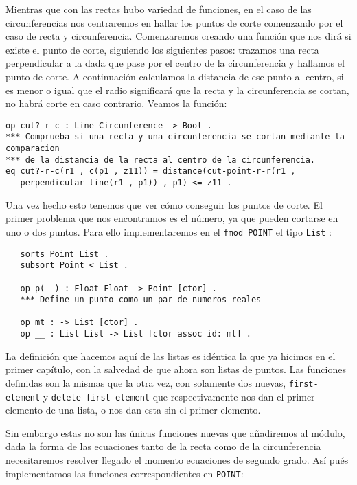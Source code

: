 Mientras que con las rectas hubo variedad de funciones, en el caso de las circunferencias nos centraremos en hallar los puntos de corte comenzando por el caso de recta y circunferencia. Comenzaremos creando una función que nos dirá si existe el punto de corte, siguiendo los siguientes pasos: trazamos una recta perpendicular a la dada que pase por el centro de la circunferencia y hallamos el punto de corte. A continuación calculamos la distancia de ese punto al centro, si es menor o igual que el radio significará que la recta y la circunferencia se cortan, no habrá corte en caso contrario. Veamos la función: \par

{\codesize
\begin{verbatim}
op cut?-r-c : Line Circumference -> Bool .
*** Comprueba si una recta y una circunferencia se cortan mediante la comparacion 
*** de la distancia de la recta al centro de la circunferencia.
eq cut?-r-c(r1 , c(p1 , z11)) = distance(cut-point-r-r(r1 , 
   perpendicular-line(r1 , p1)) , p1) <= z11 .
\end{verbatim}
}

Una vez hecho esto tenemos que ver cómo conseguir los puntos de corte. El primer problema que nos encontramos es el número, ya que pueden cortarse en uno o dos puntos. Para ello implementaremos en el \texttt{fmod POINT} el tipo \texttt{List} :

{\codesize
\begin{verbatim}
   sorts Point List .
   subsort Point < List .

   op p(__) : Float Float -> Point [ctor] .
   *** Define un punto como un par de numeros reales

   op mt : -> List [ctor] .
   op __ : List List -> List [ctor assoc id: mt] . 
\end{verbatim}
}

La definición que hacemos aquí de las listas es idéntica la que ya hicimos en el primer capítulo, con la salvedad de que ahora son listas de puntos. Las funciones definidas son la mismas que la otra vez, con solamente dos nuevas, \texttt{first-element} y \texttt{delete-first-element} que respectivamente nos dan el primer elemento de una lista, o nos dan esta sin el primer elemento.\par

Sin embargo estas no son las únicas funciones nuevas que añadiremos al módulo, dada la forma de las ecuaciones tanto de la recta como de la circunferencia necesitaremos resolver llegado el momento ecuaciones de segundo grado. Así pués implementamos las funciones correspondientes en \texttt{POINT}: \par

